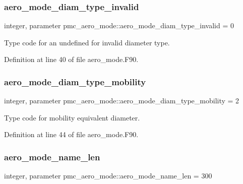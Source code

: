 \subsubsection{\texorpdfstring{aero\+\_\+mode\+\_\+diam\+\_\+type\+\_\+invalid}{aero\_mode\_diam\_type\_invalid}}
{\footnotesize\ttfamily integer, parameter pmc\+\_\+aero\+\_\+mode\+::aero\+\_\+mode\+\_\+diam\+\_\+type\+\_\+invalid = 0}



Type code for an undefined for invalid diameter type. 



Definition at line 40 of file aero\+\_\+mode.\+F90.

\mbox{\label{namespacepmc__aero__mode_add8ce2fd804c423ed56bee1f62273804}} 
\subsubsection{\texorpdfstring{aero\+\_\+mode\+\_\+diam\+\_\+type\+\_\+mobility}{aero\_mode\_diam\_type\_mobility}}
{\footnotesize\ttfamily integer, parameter pmc\+\_\+aero\+\_\+mode\+::aero\+\_\+mode\+\_\+diam\+\_\+type\+\_\+mobility = 2}



Type code for mobility equivalent diameter. 



Definition at line 44 of file aero\+\_\+mode.\+F90.

\mbox{\label{namespacepmc__aero__mode_ae84b8139739f7f4a21f52621b68f8b3b}} 
\subsubsection{\texorpdfstring{aero\+\_\+mode\+\_\+name\+\_\+len}{aero\_mode\_name\_len}}
{\footnotesize\ttfamily integer, parameter pmc\+\_\+aero\+\_\+mode\+::aero\+\_\+mode\+\_\+name\+\_\+len = 300}




